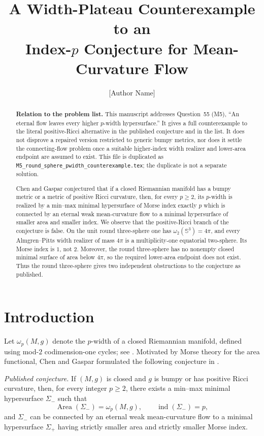 \documentclass[11pt]{article}
\title{A Width-Plateau Counterexample to an\\
Index-$p$ Conjecture for Mean-Curvature Flow}
\author{[Author Name]}
\date{}
\theoremstyle{remark}
\newcommand{\Sph}{\mathbb S}
\newcommand{\ind}{\operatorname{ind}}
\newcommand{\Area}{\operatorname{Area}}
\begin{document}
\maketitle

\begin{abstract}
\textbf{Relation to the problem list.}
This manuscript addresses Question~55 (M5), ``An eternal flow leaves every
higher $p$-width hypersurface.''  It gives a full counterexample to the
literal positive-Ricci alternative in the published conjecture and in the
list.  It does not disprove a repaired version restricted to generic bumpy
metrics, nor does it settle the connecting-flow problem once a suitable
higher-index width realizer and lower-area endpoint are assumed to exist.
This file is duplicated as \texttt{M5\_round\_sphere\_pwidth\_counterexample.tex};
the duplicate is not a separate solution.

Chen and Gaspar conjectured that if a closed Riemannian manifold has a
bumpy metric or a metric of positive Ricci curvature, then, for every
$p\geq 2$, its $p$-width is realized by a min--max minimal hypersurface of
Morse index exactly $p$ which is connected by an eternal weak
mean-curvature flow to a minimal hypersurface of smaller area and smaller
index.  We observe that the positive-Ricci branch of the conjecture is
false.  On the unit round three-sphere one has
$\omega_2(\Sph^3)=4\pi$, and every Almgren--Pitts width realizer of
mass $4\pi$ is a
multiplicity-one equatorial two-sphere.  Its Morse index is $1$, not $2$.
Moreover, the round three-sphere has no nonempty closed minimal surface of
area below $4\pi$, so the required lower-area endpoint does not exist.
Thus the round three-sphere gives two independent obstructions to the
conjecture as published.
\end{abstract}

\section{Introduction}

Let $\omega_p(M,g)$ denote the $p$-width of a closed Riemannian manifold,
defined using mod-$2$ codimension-one cycles; see
\cite{MarquesNevesPositiveRicci,Pitts}.  Motivated by Morse theory for the
area functional, Chen and Gaspar formulated the following conjecture in
\cite[Conjecture~1]{ChenGaspar}.

\medskip
\noindent
\emph{Published conjecture.}
If $(M,g)$ is closed and $g$ is bumpy or has positive Ricci curvature,
then, for every integer $p\geq2$, there exists a min--max minimal
hypersurface $\Sigma_-$ such that
\[
  \Area(\Sigma_-)=\omega_p(M,g),
  \qquad \ind(\Sigma_-)=p,
\]
and $\Sigma_-$ can be connected by an eternal weak mean-curvature flow to
a minimal hypersurface $\Sigma_+$ having strictly smaller area and
strictly smaller Morse index.
\end{document}
